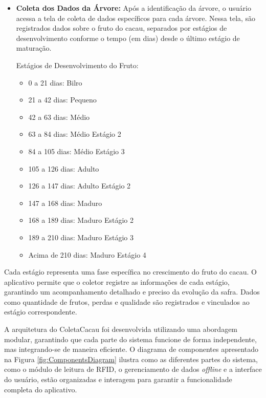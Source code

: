 \begin{itemize}
    \item \textbf{Coleta dos Dados da Árvore:} Após a identificação da árvore, o usuário acessa a tela de coleta de dados específicos para cada árvore. Nessa tela, são registrados dados sobre o fruto do cacau, separados por estágios de desenvolvimento conforme o tempo (em dias) desde o último estágio de maturação.
    
    Estágios de Desenvolvimento do Fruto:
    \begin{itemize}
        \item 0 a 21 dias: Bilro
        \item 21 a 42 dias: Pequeno
        \item 42 a 63 dias: Médio
        \item 63 a 84 dias: Médio Estágio 2
        \item 84 a 105 dias: Médio Estágio 3
        \item 105 a 126 dias: Adulto
        \item 126 a 147 dias: Adulto Estágio 2
        \item 147 a 168 dias: Maduro
        \item 168 a 189 dias: Maduro Estágio 2
        \item 189 a 210 dias: Maduro Estágio 3
        \item Acima de 210 dias: Maduro Estágio 4
    \end{itemize}
\end{itemize}

Cada estágio representa uma fase específica no crescimento do fruto do cacau. O aplicativo permite que o coletor registre as informações de cada estágio, garantindo um acompanhamento detalhado e preciso da evolução da safra. Dados como quantidade de frutos, perdas e qualidade são registrados e vinculados ao estágio correspondente.

A arquitetura do ColetaCacau foi desenvolvida utilizando uma abordagem modular, garantindo que cada parte do sistema funcione de forma independente, mas integrando-se de maneira eficiente. O diagrama de componentes apresentado na Figura \ref{fig:ComponentsDiagram} ilustra como as diferentes partes do sistema, como o módulo de leitura de RFID, o gerenciamento de dados \textit{offline} e a interface do usuário, estão organizadas e interagem para garantir a funcionalidade completa do aplicativo.

\newpage 

